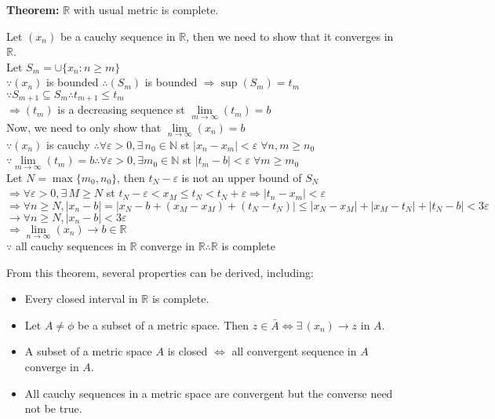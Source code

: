 \documentclass{article}
\begin{document}
\textbf{Theorem:} $\mathbb{R}$  with usual metric is complete.
\begin{tcolorbox}[colback=lightgray!10,colframe=lightgray!10, fontupper=\linespread{1.75}\selectfont]
	Let $(x_n)$ be a cauchy sequence in $\mathbb{R}$, then we need to show that it converges in $\mathbb{R}$. \\
	Let $S_m = \cup \{x_n : n \geq m\}$ \\
	$\because (x_n)$ is bounded $\therefore (S_m)$ is bounded $\Rightarrow \sup(S_m) = t_m$ \\
	$\because S_{m+1} \subseteq S_m \therefore t_{m+1} \leq t_m$ \\
	$\Rightarrow (t_m)$ is a decreasing sequence st $\lim\limits_{m \rightarrow \infty} (t_m) = b$ \\
	Now, we need to only show that $\lim\limits_{n \rightarrow \infty} (x_n) = b$ \\
	$\because (x_n)$ is cauchy $\therefore \forall \varepsilon > 0, \exists \, n_0 \in \mathbb{N}$ st $|x_n - x_m| < \varepsilon \; \forall n,m \geq n_0$ \\
	$\because \lim\limits_{m \rightarrow \infty} (t_m) = b \therefore \forall \varepsilon > 0, \exists m_0 \in \mathbb{N}$ st $|t_m-b| < \varepsilon \; \forall m \geq m_0$ \\
	Let $N = \max \{m_0, n_0\}$, then $t_N - \varepsilon$ is not an upper bound of $S_N$ \\
	$\Rightarrow \forall \varepsilon > 0, \exists \, M \geq N$ st $t_N - \varepsilon < x_M \leq t_N < t_N + \varepsilon \Rightarrow |t_n-x_m| < \varepsilon$ \\
	$\Rightarrow \forall n \geq N, |x_n-b| = |x_N-b + (x_M-x_M) + (t_N-t_N)| \leq |x_N-x_M| + |x_M-t_N|+|t_N-b| < 3\varepsilon$ \\
	$\rightarrow  \forall n \geq N, |x_n-b| < 3\varepsilon$ \\
	$\Rightarrow \lim\limits_{n \rightarrow \infty} (x_n) \rightarrow b \in \mathbb{R}$ \\
	$\because$ all cauchy sequences in $\mathbb{R}$ converge in $\mathbb{R} \therefore \mathbb{R}$ is complete
\end{tcolorbox}

From this theorem, several properties can be derived, including:
\begin{itemize}
	\item Every closed interval in $\mathbb{R}$ is complete.
	\item Let $A \not= \phi$ be a subset of a metric space. Then $z \in \bar{A} \iff \exists \,  (x_n) \rightarrow z$ in $A$.
	\item A subset of a metric space $A$ is closed $\iff$ all convergent sequence in $A$ converge in $A$.
	\item All cauchy sequences in a metric space are convergent but the converse need not be true.
\end{itemize}
\end{document}
